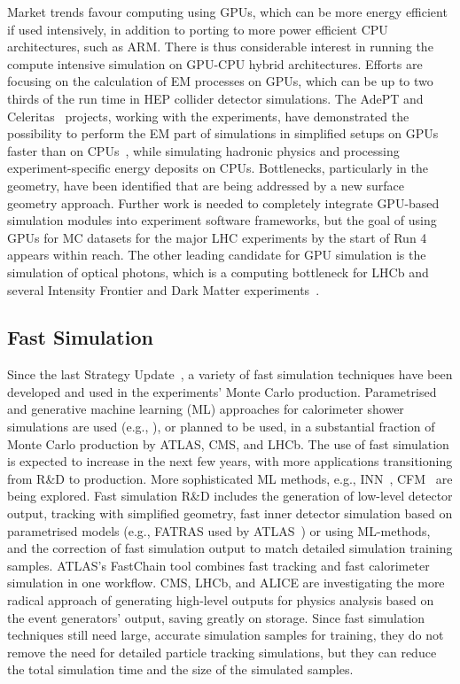 \documentclass[10pt,a4paper]{article}
\begin{document}
Market trends favour computing using GPUs, which can be more energy efficient if
used intensively, in addition to porting to more power efficient CPU
architectures, such as ARM. There is thus considerable interest in running the
compute intensive simulation on GPU-CPU hybrid architectures. Efforts are
focusing on the calculation of EM processes on GPUs, which can be up to two
thirds of the run time in HEP collider detector simulations. The AdePT
\cite{Amadio_2023, AdePT} and Celeritas~\cite{osti_2361202} projects, working with the
experiments, have demonstrated the possibility to perform the EM part of
simulations in simplified setups on GPUs faster than on
CPUs~\cite{CHEP2024:celeritas_improvements, CHEP2024:adept_gpu_em_transport},
while simulating hadronic physics and
processing experiment-specific energy deposits on CPUs. Bottlenecks,
particularly in the geometry, have been identified that are being addressed by a
new surface geometry approach. Further work is needed to completely integrate GPU-based
simulation modules into experiment software frameworks, but the goal of using
GPUs for MC datasets for the major LHC experiments by the start of Run 4 appears
within reach. The other leading candidate for GPU simulation is the simulation
of optical photons, which is a computing bottleneck for LHCb and several
Intensity Frontier and Dark Matter experiments~\cite{opticksCHEP}.

\subsection{Fast Simulation}\label{fast-simulation}

Since the last Strategy Update~\cite{European:2720131}, a variety of fast simulation
techniques have been developed and used in the experiments' Monte Carlo
production. Parametrised and generative machine learning (ML) approaches for
calorimeter shower simulations are used (e.g., \cite{af3}), or planned to be
used, in a substantial fraction of Monte Carlo production by ATLAS, CMS, and
LHCb. The use of fast simulation is expected to increase in the next few years,
with more applications transitioning from R\&D to production. More sophisticated
ML methods, e.g., INN~\cite{kim2021innmethodidentifyingcleanannotated},
CFM~\cite{tong2024improvinggeneralizingflowbasedgenerative} are being explored.
Fast simulation R\&D includes the generation of low-level detector output,
tracking with simplified geometry, fast inner detector simulation based on
parametrised models (e.g., FATRAS used by ATLAS~\cite{fatras}) or using
ML-methods, and the correction of fast simulation output to match detailed
simulation training samples. ATLAS's FastChain tool combines fast tracking and
fast calorimeter simulation in one workflow. CMS, LHCb, and ALICE are
investigating the more radical approach of generating high-level outputs for
physics analysis based on the event generators' output, saving greatly on
storage. Since fast simulation techniques still need large, accurate simulation
samples for training, they do not remove the need for detailed particle tracking
simulations, but they can reduce the total simulation time and the size of the
simulated samples.
\end{document}
